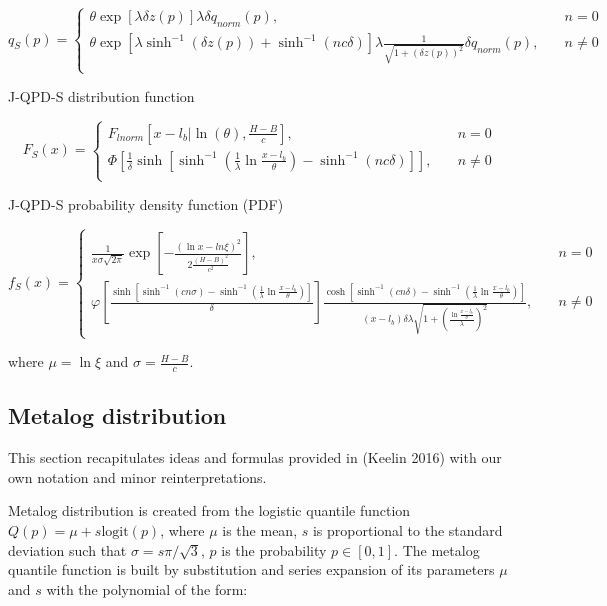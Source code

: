 \documentclass[
  letterpaper,
  DIV=11,
  numbers=noendperiod]{scrartcl}
\begin{document}
\[
q_S(p)=\begin{cases}
\theta\exp\left[\lambda\delta z(p)\right]\lambda\delta q_{norm}(p), \quad &n=0\\
\theta\exp\left[\lambda\sinh^{-1}(\delta z(p))+\sinh^{-1}(nc\delta)\right]\lambda\frac{1}{\sqrt{1+(\delta z(p))^2}}\delta q_{norm}(p), \quad &n\neq0\\
\end{cases}
\]

J-QPD-S distribution function

\[
F_S(x)=\begin{cases}
F_{lnorm}\left[x-l_b\vert \ln(\theta), \frac{H-B}{c}\right], \quad &n=0\\
\Phi\left[\frac{1}{\delta}\sinh\left[\sinh^{-1}\left(\frac{1}{\lambda}\ln\frac{x-l_b}{\theta}\right)-\sinh^{-1}(nc\delta)\right]\right], \quad &n\neq0\\
\end{cases}
\]

J-QPD-S probability density function (PDF)

\[
f_S(x)=\begin{cases}
\frac{1}{x\sigma\sqrt{2\pi}}\exp\left[-\frac{(\ln x-ln\xi)^2}{2\frac{(H-B)^2}{c^2}}\right], \quad &n=0\\
\varphi\left[\frac{\sinh\left[\sinh^{-1}(cn\sigma)-\sinh^{-1}\left(\frac{1}{\lambda}\ln\frac{x-l_b}{\theta}\right)\right]}{\delta}\right]\frac{\cosh[\sinh^{-1}\left(cn\delta\right)-\sinh^{-1}\left(\frac{1}{\lambda}\ln\frac{x-l_b}{\theta}\right)]}{(x-l_b)\delta\lambda\sqrt{1+\left(\frac{\ln\frac{x-l_b}{\theta}}{\lambda}\right)^2}}, \quad &n \neq 0
\end{cases}
\]

where \(\mu=\ln\xi\) and \(\sigma=\frac{H-B}{c}\).

\subsection*{Metalog distribution}\label{metalog-distribution}

This section recapitulates ideas and formulas provided in (Keelin 2016)
with our own notation and minor reinterpretations.

Metalog distribution is created from the logistic quantile function
\(Q(p)=\mu+s\text{logit}(p)\), where \(\mu\) is the mean, \(s\) is
proportional to the standard deviation such that \(\sigma=s\pi/\sqrt3\),
\(p\) is the probability \(p \in [0,1]\). The metalog quantile function
is built by substitution and series expansion of its parameters \(\mu\)
and \(s\) with the polynomial of the form:
\end{document}
